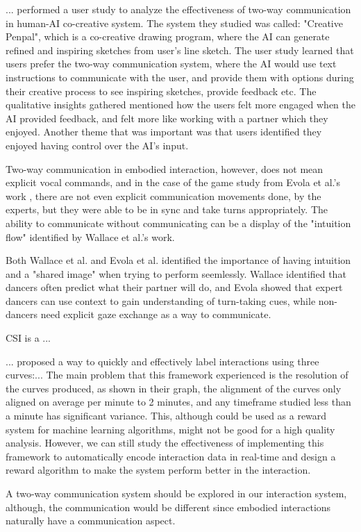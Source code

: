 \documentclass[final,5p,times,twocolumn,authoryear]{article}
\begin{document}
... performed a user study to analyze the effectiveness of two-way
communication in human-AI co-creative system. The system they studied
was called: "Creative Penpal", which is a co-creative drawing program,
where the AI can generate refined and inspiring sketches from user's
line sketch. The user study learned that users prefer the two-way
communication system, where the AI would use text instructions to
communicate with the user, and provide them with options during their
creative process to see inspiring sketches, provide feedback etc. The
qualitative insights gathered mentioned how the users felt more engaged
when the AI provided feedback, and felt more like working with a partner
which they enjoyed. Another theme that was important was that users
identified they enjoyed having control over the AI's input.

Two-way communication in embodied interaction, however, does not mean
explicit vocal commands, and in the case of the game study from Evola et
al.'s work \cite{Evola}, there are not even explicit communication
movements done, by the experts, but they were able to be in sync and
take turns appropriately. The ability to communicate without
communicating can be a display of the "intuition flow" identified by
Wallace et al.'s work.

Both Wallace et al. and Evola et al. identified the importance of having
intuition and a "shared image" when trying to perform seemlessly.
Wallace identified that dancers often predict what their partner will
do, and Evola showed that expert dancers can use context to gain
understanding of turn-taking cues, while non-dancers need explicit gaze
exchange as a way to communicate. 


CSI is a ...

... proposed a way to quickly and effectively label interactions using
three curves:...
The main problem that this framework experienced is the resolution of
the curves produced, as shown in their graph, the alignment of the
curves only aligned on average per minute to 2 minutes, and any
timeframe studied less than a minute has significant variance. This,
although could be used as a reward system for machine learning
algorithms, might not be good for a high quality analysis. However, we
can still study the effectiveness of implementing this framework to
automatically encode interaction data in real-time and design a reward
algorithm to make the system perform better in the interaction.

A two-way communication system should be explored in our interaction
system, although, the communication would be different since embodied
interactions naturally have a communication aspect.
\end{document}
